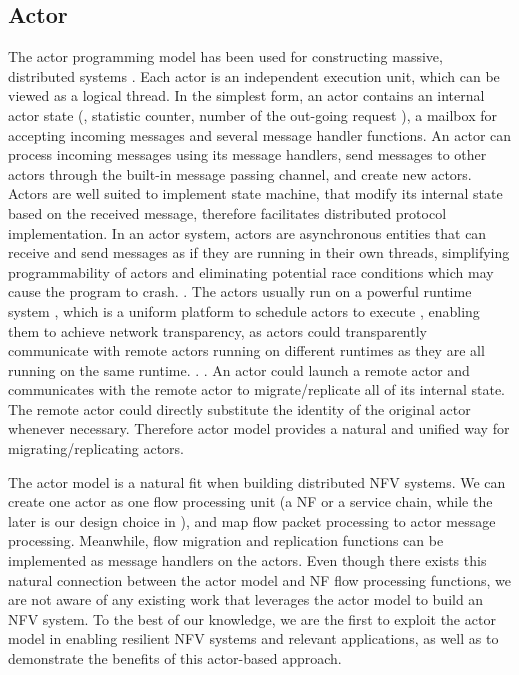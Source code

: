\subsection{Actor}

The actor programming model has been used for constructing massive, distributed systems \cite{actor-wiki, akka, newell2016optimizing, AnalysisActor}. Each actor is an independent execution unit, which can be viewed as a logical thread. In the simplest form, an actor contains an internal actor state (\eg, statistic counter, \ac{number of the out-going request} ), a mailbox for accepting incoming messages and several message handler functions. An actor can process incoming messages using its message handlers, send messages to other actors through the built-in message passing channel, and create new actors. \ac{Actors are well suited to implement state machine, that modify its internal state based on the received message, therefore facilitates distributed protocol implementation.}  In an actor system, actors are asynchronous entities that can receive and send messages as if they are running \ac{in their own threads, simplifying programmability of actors and eliminating potential race conditions which may cause the program to crash.} . The actors usually run on a powerful runtime system \cite{erlang, akka, caf}, \ac{which is a uniform platform to schedule actors to execute} , enabling them to achieve network transparency, \ac{as actors could transparently communicate with remote actors running on different runtimes as they are all running on the same runtime.}  . . \ac{An actor could launch a remote actor and communicates with the remote actor to migrate/replicate all of its internal state. The remote actor could directly substitute the identity of the original actor whenever necessary. Therefore actor model provides a natural and unified way for migrating/replicating actors.}

The actor model is a natural fit when building distributed NFV systems. We can create one actor as one flow processing unit (a NF or a service chain, while the later is our design choice in \nfactor), and map flow packet processing to actor message processing. Meanwhile, flow migration and replication functions can be implemented as message handlers on the actors. Even though there exists this natural connection between the actor model and NF flow processing functions, we are not aware of any existing work that leverages the actor model to build an NFV system. %
 To the best of our knowledge, we are the first to exploit the actor model in enabling resilient NFV systems and relevant applications, as well as to demonstrate the benefits of this actor-based approach.



